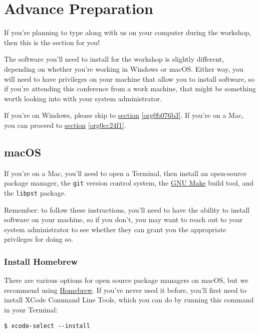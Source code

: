 \documentclass[11pt]{article}
\begin{document}
\section{Advance Preparation \label{org4ca6623}}
\label{sec:orgaee2422}

If you're planning to type along with us on your computer during the
workshop, then this is the section for you!

The software you'll need to install for the workshop is slightly
different, depending on whether you're working in Windows or macOS.
Either way, you will need to have privileges on your machine that
allow you to install software, so if you're attending this conference
from a work machine, that might be something worth looking into with
your system administrator.

If you're on Windows, please skip to \hyperref[org0b076b3]{section} \ref{org0b076b3}.  If you're on a
Mac, you can proceed to \hyperref[org0cc24f1]{section} \ref{org0cc24f1}.

\subsection{macOS \label{org0cc24f1}}
\label{sec:org932e01b}

If you're on a Mac, you'll need to open a Terminal, then install an
open-source package manager, the \texttt{git} version control system, the
\href{https://www.gnu.org/software/make/}{GNU Make} build tool, and the
\texttt{libpst} package.

Remember: to follow these instructions, you'll need to have the
ability to install software on your machine, so if you don't, you may
want to reach out to your system administrator to see whether they can
grant you the appropriate privileges for doing so.

\subsubsection{Install Homebrew}
\label{sec:orgab08e41}

There are various options for open source package managers on macOS,
but we recommend using \href{https://brew.sh}{Homebrew}.  If you've never used it
before, you'll first need to install XCode Command Line Tools, which
you can do by running this command in your Terminal:

\begin{verbatim}
$ xcode-select --install
\end{verbatim}
\end{document}
